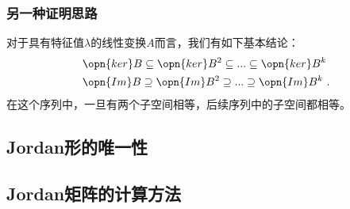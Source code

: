 \subsubsection{另一种证明思路}
对于具有特征值$\lambda$的线性变换$A$而言，我们有如下基本结论：
\begin{equation}
\begin{aligned}
&\opn{ker}B\subseteq\opn{ker}B^2\subseteq...\subseteq\opn{ker}B^k\\
&\opn{Im}B\supseteq\opn{Im}B^2\supseteq...\supseteq\opn{Im}B^k~.
\end{aligned}
\end{equation}
在这个序列中，一旦有两个子空间相等，后续序列中的子空间都相等。
\begin{lemma}{}

\end{lemma}
\subsection{Jordan形的唯一性}

\subsection{Jordan矩阵的计算方法}